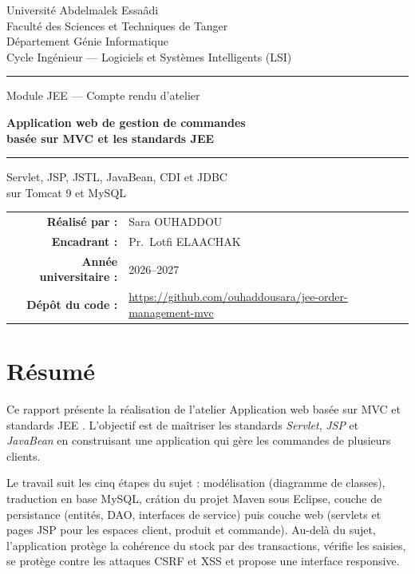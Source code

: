 \documentclass[11pt,a4paper]{report}
\newcommand{\titre}{Application web de gestion de commandes\\ bas\'ee sur MVC et les standards JEE}
\newcommand{\auteur}{Sara OUHADDOU}          %
\newcommand{\encadrant}{Pr.\ Lotfi ELAACHAK}
\newcommand{\annee}{2026--2027}
\newcommand{\depot}{https://github.com/ouhaddousara/jee-order-management-mvc}
\begin{document}
\begin{titlepage}
\centering
{\small Universit\'e Abdelmalek Essa\^adi\\
Facult\'e des Sciences et Techniques de Tanger\\
D\'epartement G\'enie Informatique\\
Cycle Ing\'enieur --- Logiciels et Syst\`emes Intelligents (LSI)\par}
\vspace{2.2cm}
{\color{teal}\rule{\textwidth}{1.2pt}}\par\vspace{0.6cm}
{\large Module JEE --- Compte rendu d'atelier\par}
\vspace{0.6cm}
{\Huge\bfseries\color{ink}\titre\par}
\vspace{0.6cm}
{\color{saffron}\rule{0.25\textwidth}{2.5pt}}\par
\vspace{0.8cm}
{\large Servlet, JSP, JSTL, JavaBean, CDI et JDBC\\ sur Tomcat 9 et MySQL\par}
\vfill
\begin{tabular}{rl}
\textbf{R\'ealis\'e par :} & \auteur\\[4pt]
\textbf{Encadrant :} & \encadrant\\[4pt]
\textbf{Ann\'ee universitaire :} & \annee\\[4pt]
\textbf{D\'ep\^ot du code :} & \small\url{\depot}
\end{tabular}
\vspace{1.2cm}
\end{titlepage}

\chapter*{R\'esum\'e}
Ce rapport pr\'esente la r\'ealisation de l'atelier \og Application web bas\'ee sur MVC et standards JEE \fg{}. L'objectif est de ma\^itriser les standards \emph{Servlet}, \emph{JSP} et \emph{JavaBean} en construisant une application qui g\`ere les commandes de plusieurs clients.

Le travail suit les cinq \'etapes du sujet : mod\'elisation (diagramme de classes), traduction en base MySQL, cr\'ation du projet Maven sous Eclipse, couche de persistance (entit\'es, DAO, interfaces de service) puis couche web (servlets et pages JSP pour les espaces client, produit et commande). Au-del\`a du sujet, l'application prot\`ege la coh\'erence du stock par des transactions, v\'erifie les saisies, se prot\`ege contre les attaques CSRF et XSS et propose une interface responsive.
\end{document}

